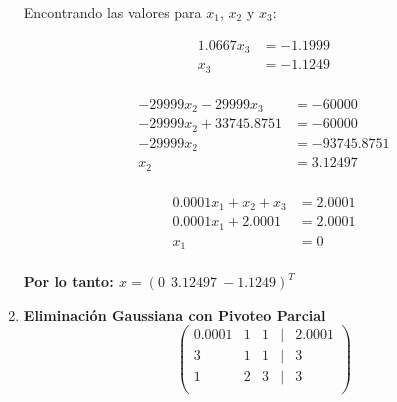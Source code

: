 \begin{enumerate}
            Encontrando las valores para $x_1$, $x_2$ y $x_3$: 
            
            \begin{equation*}
                \begin{split}
                    1.0667x_3   & = -1.1999 \\
                    x_3         & = -1.1249 \\
                \end{split}
            \end{equation*}
            
            \begin{equation*}
                \begin{split}
                    -29999x_2 - 29999x_3    & = -60000          \\
                    -29999x_2 + 33745.8751  & = -60000          \\
                    -29999x_2               & = -93745.8751     \\
                    x_2                     & = 3.12497         \\
                \end{split}
            \end{equation*}
            
            \begin{equation*}
                \begin{split}
                    0.0001x_1 + x_2 + x_3   & = 2.0001          \\
                    0.0001x_1 + 2.0001      & = 2.0001          \\
                    x_1                     & = 0               \\
                \end{split}
            \end{equation*}
            
            \textbf{Por lo tanto: $x = (0 \ \ 3.12497 \ -1.1249)^T$}\\
            
        
        \item \textbf{Eliminación Gaussiana con Pivoteo Parcial}\\
        
            \[ \left( \begin{array}{ccccc}
                 0.0001 & 1 & 1 & | & 2.0001    \\
                 3      & 1 & 1 & | & 3         \\
                 1      & 2 & 3 & | & 3         \\
            \end{array}
            \right)  
            \]
            

\end{enumerate}
